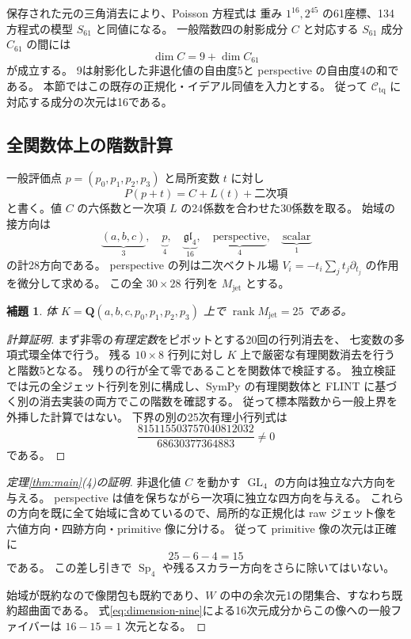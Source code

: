 \documentclass[11pt,a4paper]{ltjsarticle}
\newcommand{\QQ}{\mathbf Q}
\newcommand{\cC}{\mathcal C_{\mathrm{tq}}}
\DeclareMathOperator{\GL}{GL}
\DeclareMathOperator{\Sp}{Sp}
\DeclareMathOperator{\rank}{rank}
\newtheorem{lemma}[theorem]{補題}
\theoremstyle{remark}
\begin{document}
保存された元の三角消去により、Poisson 方程式は
重み $1^{16},2^{45}$ の61座標、134方程式の模型 $S_{61}$ と同値になる。
一般階数四の射影成分 $C$ と対応する $S_{61}$ 成分 $C_{61}$ の間には
\begin{equation}\label{eq:dimension-nine}
 \dim C=9+\dim C_{61}
\end{equation}
が成立する。
9は射影化した非退化値の自由度5と perspective の自由度4の和である。
本節ではこの既存の正規化・イデアル同値を入力とする。
従って $\cC$ に対応する成分の次元は16である。

\subsection{全関数体上の階数計算}

一般評価点 $p=(p_0,p_1,p_2,p_3)$ と局所変数 $t$ に対し
\[
 P(p+t)=C+L(t)+\text{二次項}
\]
と書く。値 $C$ の六係数と一次項 $L$ の24係数を合わせた30係数を取る。
始域の接方向は
\[
 \underbrace{(a,b,c)}_{3},\quad
 \underbrace{p}_{4},\quad
 \underbrace{\mathfrak{gl}_4}_{16},\quad
 \underbrace{\text{perspective}}_{4},\quad
 \underbrace{\text{scalar}}_{1}
\]
の計28方向である。
perspective の列は二次ベクトル場
$V_i=-t_i\sum_jt_j\partial_{t_j}$ の作用を微分して求める。
この全 $30\times28$ 行列を $M_{\mathrm{jet}}$ とする。

\begin{lemma}\label{lem:jet}
体 $K=\QQ(a,b,c,p_0,p_1,p_2,p_3)$ 上で
$\rank M_{\mathrm{jet}}=25$ である。
\end{lemma}
\begin{proof}[計算証明]
まず非零の\emph{有理定数}をピボットとする20回の行列消去を、
七変数の多項式環全体で行う。
残る $10\times8$ 行列に対し $K$ 上で厳密な有理関数消去を行うと階数5となる。
残りの行が全て零であることを関数体で検証する。
独立検証では元の全ジェット行列を別に構成し、SymPy の有理関数体と
FLINT に基づく別の消去実装の両方でこの階数を確認する。
従って標本階数から一般上界を外挿した計算ではない。
下界の別の25次有理小行列式は
\[
 \frac{815115503757040812032}{68630377364883}\ne0
\]
である。
\end{proof}

\begin{proof}[定理\ref{thm:main}(4)の証明]
非退化値 $C$ を動かす $\GL_4$ の方向は独立な六方向を与える。
perspective は値を保ちながら一次項に独立な四方向を与える。
これらの方向を既に全て始域に含めているので、局所的な正規化は
raw ジェット像を六値方向・四跡方向・primitive 像に分ける。
従って primitive 像の次元は正確に
\[
 25-6-4=15
\]
である。
この差し引きで $\Sp_4$ や残るスカラー方向をさらに除いてはいない。

始域が既約なので像閉包も既約であり、$W$ の中の余次元1の閉集合、すなわち既約超曲面である。
式\eqref{eq:dimension-nine}による16次元成分からこの像への一般ファイバーは
$16-15=1$ 次元となる。
\end{proof}
\end{document}
